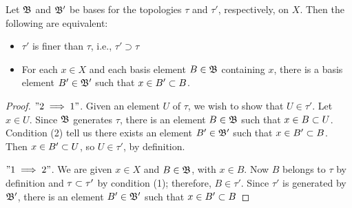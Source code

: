 \begin{lem}
	Let $\mathfrak{B} $ and $ \mathfrak{B'} $ be bases for the topologies $ \tau $ and $ \tau'$, respectively, on $X$. Then the following are equivalent:
	\begin{itemize}
		\item $ \tau' $ is finer than $ \tau $, i.e., $\tau' \supset \tau$
		\item For each $ x \in X$ and each basis element $B \in \mathfrak{B} $ containing $x$, there is a basis element $ B' \in \mathfrak{B'} $ such that $ x \in B' \subset B$.
	\end{itemize}
\end{lem}
\begin{proof}
	$" 2 \implies 1 " $. Given an element $U$ of $ \tau $, we wish to show that $ U \in \tau'$. Let $ x \in U $. Since $ \mathfrak{B} $ generates $\tau$, there is an element $ B \in \mathfrak{B} $ such that $ x \in B \subset U$. Condition (2) tell us there exists an element $ B' \in \mathfrak{B'} $ such that $x \in B'\subset B$. Then $x \in B'\subset U$, so $U \in \tau'$, by definition.
	
	$" 1 \implies 2 " $. We are given $ x \in X $ and $B \in \mathfrak{B} $, with $x \in B$. Now $B$ belongs to $ \tau $ by definition and $ \tau \subset \tau'$ by condition (1); therefore, $ B \in \tau'$. Since $ \tau'$ is generated by $ \mathfrak{B'}$, there is an element $ B'\in \mathfrak{B'}$ such that $ x \in B' \subset B$
\end{proof}


